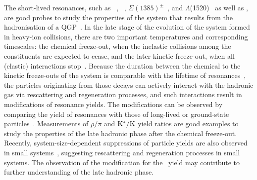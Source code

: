The short-lived resonances, such as \rhoz~\cite{ALICE:2018qdv}, \kstar~\cite{ALICE:2019etb, ALICE:2016sak}, $\Sigma(1385)^{\pm}$~\cite{ALICE:2022zuc}, and $\Lambda$(1520)~\cite{ALICE:2018ewo} as well as \fzero, are good probes to study the properties of the system that results from the hadronisation of a QGP~\cite{Bierlich:2021poz}. In the late stage of the evolution of the system formed in heavy-ion collisions, there are two important temperatures and corresponding timescales: the chemical freeze-out, when the inelastic collisions among the constituents are expected to cease, and the later kinetic freeze-out, when all (elastic) interactions stop~\cite{Song:1996ik}. Because the duration between the chemical to the kinetic freeze-outs of the system is comparable with the lifetime of resonances~\cite{ALICE:2011dyt, ALICE:2019xyr}, the particles originating from those decays can actively interact with the hadronic gas via rescattering and regeneration processes, and such interactions result in modifications of resonance yields. The modifications can be observed by comparing the yield of resonances with those of long-lived or ground-state particles~\cite{ALICE:2018pal}. Measurements of $\rho/\pi$ and $\rm{}K^{*}/K$ yield ratios are good examples to study the properties of the late hadronic phase after the chemical freeze-out. Recently, system-size-dependent suppressions of particle yields are also observed in small systems~\cite{ALICE:2019etb}, suggesting rescattering and regeneration processes in small systems. The observation of the modification for the \fzero~yield may contribute to further understanding of the late hadronic phase.






